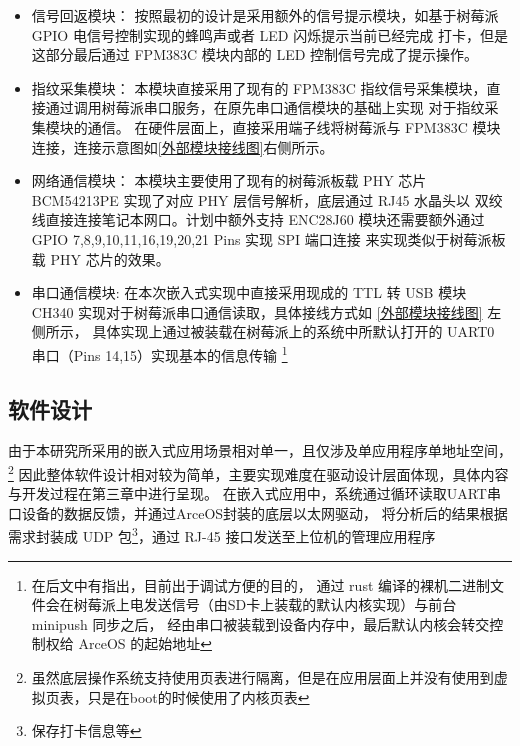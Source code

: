     \begin{itemize}
        \item 信号回返模块：
            按照最初的设计是采用额外的信号提示模块，如基于树莓派 GPIO 电信号控制实现的蜂鸣声或者 LED 闪烁提示当前已经完成
            打卡，但是这部分最后通过 FPM383C 模块内部的 LED 控制信号完成了提示操作。
        \item 指纹采集模块：
            本模块直接采用了现有的 FPM383C 指纹信号采集模块，直接通过调用树莓派串口服务，在原先串口通信模块的基础上实现
            对于指纹采集模块的通信。
            在硬件层面上，直接采用端子线将树莓派与 FPM383C 模块连接，连接示意图如\ref{外部模块接线图}右侧所示\cite{fpm383c-module-specification}。
        \item 网络通信模块：
            本模块主要使用了现有的树莓派板载 PHY 芯片 BCM54213PE 实现了对应 PHY 层信号解析，底层通过 RJ45 水晶头以
            双绞线直接连接笔记本网口。计划中额外支持 ENC28J60 模块还需要额外通过 GPIO 7,8,9,10,11,16,19,20,21 Pins 实现 SPI 端口连接
            来实现类似于树莓派板载 PHY 芯片的效果。
        \item 串口通信模块:
            在本次嵌入式实现中直接采用现成的 TTL 转 USB 模块 CH340 实现对于树莓派串口通信读取，具体接线方式如 \ref{外部模块接线图} 左侧所示，
            具体实现上通过被装载在树莓派上的系统中所默认打开的 UART0 串口（Pins 14,15）实现基本的信息传输
            \footnote{在后文中有指出，目前出于调试方便的目的，
            通过 rust 编译的裸机二进制文件会在树莓派上电发送信号（由SD卡上装载的默认内核实现）与前台 minipush 同步之后，
            经由串口被装载到设备内存中，最后默认内核会转交控制权给 ArceOS 的起始地址}
    \end{itemize}

\subsection{软件设计}

    由于本研究所采用的嵌入式应用场景相对单一，且仅涉及单应用程序单地址空间，
    \footnote{虽然底层操作系统支持使用页表进行隔离，但是在应用层面上并没有使用到虚拟页表，只是在boot的时候使用了内核页表}
    因此整体软件设计相对较为简单，主要实现难度在驱动设计层面体现，具体内容与开发过程在第三章中进行呈现。
    在嵌入式应用中，系统通过循环读取UART串口设备的数据反馈，并通过ArceOS封装的底层以太网驱动，
    将分析后的结果根据需求封装成 UDP 包\footnote{保存打卡信息等}，通过 RJ-45 接口发送至上位机的管理应用程序

